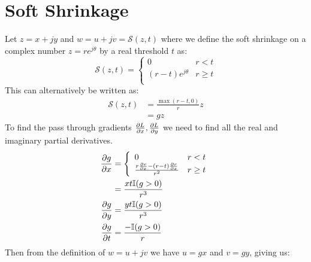 \section{Soft Shrinkage}\label{app:ch6:soft_shrink}
Let $z = x + jy$ and $w = u+jv = \mathcal{S}(z, t)$ where we define the soft
shrinkage on a complex number $z = re^{j\theta}$ by a real threshold $t$ as:
\begin{equation}
  \mathcal{S}(z, t) = \left\{ \begin{array}{ll}
      0 & r < t \\
      (r-t)e^{j\theta} & r \geq t\\
\end{array}
\right. 
\end{equation}
This can alternatively be written as:
\begin{align}
  \mathcal{S}(z, t) &= \frac{\max(r-t, 0)}{r} z \\
                    &= gz
\end{align}
To find the pass through gradients $\frac{\partial L}{\partial x}, \frac{\partial L}{\partial y}$ we need to find
all the real and imaginary partial derivatives.
\begin{align}
  \frac{\partial g}{\partial x} &= \left\{ \begin{array}{ll}
      0 & r < t \\
      \frac{r \frac{\partial r}{\partial x} - (r-t)\frac{\partial r}{\partial x}}{r^2}  & r \geq t
  \end{array} \right.  \\
  &= \frac{xt\mathbb{I}(g > 0)}{r^3} \\
  \frac{\partial g}{\partial y}&= \frac{yt\mathbb{I}(g > 0)}{r^3} \\
  \frac{\partial g}{\partial t}&= \frac{-\mathbb{I}(g > 0)}{r} 
\end{align}
Then from the definition of $w = u+jv$ we have $u=gx$ and $v=gy$, giving us:

